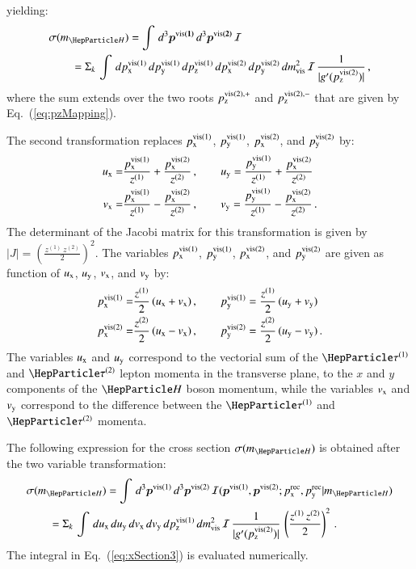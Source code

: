 yielding:
\begin{align}
& \sigma(m_{\PHiggs}) =
\int \, d^{3}\bm{p^{\vis(1)}} \, d^{3}\bm{p^{\vis(2)}} \, \mathcal{I} \nonumber \\
& \qquad 
 = \Sigma_{k} \, \int \, d\pX^{\vis(1)} \, d\pY^{\vis(1)} \,
d\pZ^{\vis(1)} \, d\pX^{\vis(2)} \, d\pY^{\vis(2)} \, dm_{\vis}^{2} \,
\mathcal{I} \, \frac{1}{\vert g'(p_{\textrm{z}}^{\vis(2)}) \vert} \, ,
\label{eq:xSection2}
\end{align}
where the sum extends over the two roots $p_{\textrm{z}}^{\textrm{vis}(2),+}$
and $p_{\textrm{z}}^{\textrm{vis}(2),-}$ that are given by Eq.~(\ref{eq:pzMapping}).

The second transformation replaces $p_{\textrm{x}}^{\textrm{vis}(1)}$, $p_{\textrm{y}}^{\textrm{vis}(1)}$, $p_{\textrm{x}}^{\textrm{vis}(2)}$, and $p_{\textrm{y}}^{\textrm{vis}(2)}$ by:
\begin{align}
u_{\textrm{x}} = & \frac{p_{\textrm{x}}^{\textrm{vis}(1)}}{z^{(1)}} +
\frac{p_{\textrm{x}}^{\textrm{vis}(2)}}{z^{(2)}} \, , \qquad
  u_{\textrm{y}} = \frac{p_{\textrm{y}}^{\textrm{vis}(1)}}{z^{(1)}} + \frac{p_{\textrm{x}}^{\textrm{vis}(2)}}{z^{(2)}} \nonumber \\
v_{\textrm{x}} = & \frac{p_{\textrm{x}}^{\textrm{vis}(1)}}{z^{(1)}} -
\frac{p_{\textrm{x}}^{\textrm{vis}(2)}}{z^{(2)}} \, , \qquad
  v_{\textrm{y}} = \frac{p_{\textrm{y}}^{\textrm{vis}(1)}}{z^{(1)}} - \frac{p_{\textrm{x}}^{\textrm{vis}(2)}}{z^{(2)}} \, .
\label{eq:varTransform_uX_uY_vX_vY}
\end{align}
The determinant of the Jacobi matrix for this transformation is given by $\vert J \vert = \left( \frac{z^{(1)} \, z^{(2)}}{2} \right)^{2}$.
The variables $p_{\textrm{x}}^{\textrm{vis}(1)}$, $p_{\textrm{y}}^{\textrm{vis}(1)}$, $p_{\textrm{x}}^{\textrm{vis}(2)}$, and $p_{\textrm{y}}^{\textrm{vis}(2)}$ are given 
as function of $u_{\textrm{x}}$, $u_{\textrm{y}}$, $v_{\textrm{x}}$, and $v_{\textrm{y}}$ by:
\begin{align}
p_{\textrm{x}}^{\textrm{vis}(1)} = & \frac{z^{(1)}}{2} \, ( u_{\textrm{x}} + v_{\textrm{x}} ) \, , \qquad
  p_{\textrm{y}}^{\textrm{vis}(1)} = \frac{z^{(1)}}{2} \, ( u_{\textrm{y}} + v_{\textrm{y}} ) \nonumber \\
p_{\textrm{x}}^{\textrm{vis}(2)} = & \frac{z^{(2)}}{2} \, ( u_{\textrm{x}} - v_{\textrm{x}} ) \, , \qquad
  p_{\textrm{y}}^{\textrm{vis}(2)} = \frac{z^{(2)}}{2} \, ( u_{\textrm{y}} - v_{\textrm{y}} ) \, . 
\label{eq:varTransform_uX_uY_vX_vY_inverse}
\end{align}
The variables $u_{\textrm{x}}$ and $u_{\textrm{y}}$ correspond to the vectorial sum of the $\Pgt^{(1)}$ and $\Pgt^{(2)}$ lepton momenta in the transverse plane,
\ie to the $x$ and $y$ components of the $\PHiggs$ boson momentum,
while the variables $v_{\textrm{x}}$ and $v_{\textrm{y}}$ correspond to the difference
between the $\Pgt^{(1)}$ and $\Pgt^{(2)}$ momenta.

The following expression for the cross section $\sigma(m_{\PHiggs})$
is obtained after the two variable transformation:
\begin{align}
& \sigma(m_{\PHiggs}) =
\int \, d^{3}\bm{p}^{\vis(1)} \, d^{3}\bm{p}^{\vis(2)} \,
\mathcal{I}(\bm{p}^{\vis(1)},\bm{p}^{\vis(2)};\pX^{\rec},\pY^{\rec}|m_{\PHiggs})
\nonumber \\
& \qquad
  = \Sigma_{k} \, \int \, d\uX \, d\uY \, d\vX \, d\vY \, d\pZ^{\vis(1)}
\, dm_{\vis}^{2} \, \mathcal{I} \, \frac{1}{\vert
  g'(p_{\textrm{z}}^{\vis(2)}) \vert} \, \left( \frac{z^{(1)} \, z^{(2)}}{2} \right)^{2} \, .
\label{eq:xSection3}
\end{align}
The integral in Eq.~(\ref{eq:xSection3}) is evaluated numerically.

